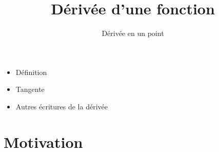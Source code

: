 









\title{{\bf Dérivée d'une fonction}}
\subtitle{Dérivée en un point}

\begin{frame}
  
  \debutmontitre

  \pause

{\footnotesize
\hfill
{}
\begin{minipage}{0.6\textwidth}
  \begin{itemize}
    \item<3-> Définition
    \item<4-> Tangente
    \item<5-> Autres écritures de la dérivée
  \end{itemize}
\end{minipage}
}

\end{frame}

\setcounter{framenumber}{0}




\section*{Motivation}


